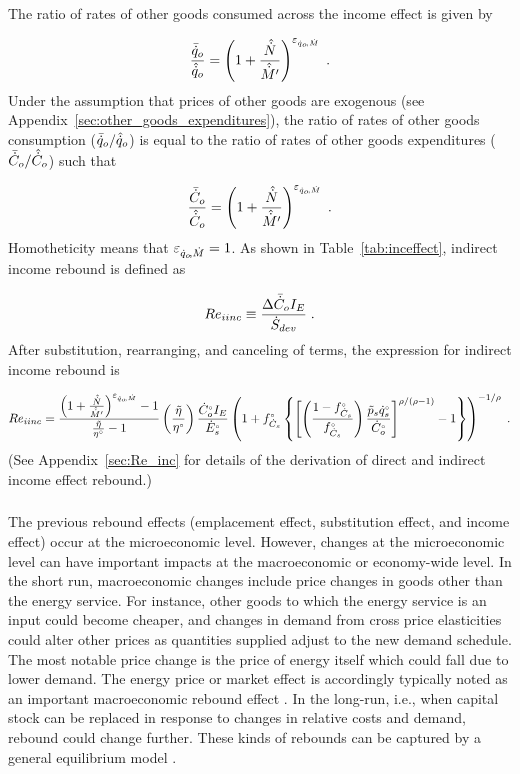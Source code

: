 \documentclass[12pt]{article}\usepackage[]{graphicx}\usepackage[]{xcolor}
\begin{document}
The ratio of rates of other goods consumed across the income effect is given by

\begin{equation} \label{eq:qorat_eqoM}
  \frac{\bar{\dot{q}}_o}{\hat{\dot{q}}_o} = \left( 1 + \frac{\hat{\dot{N}}}{\hat{\dot{M}}^\prime} \right) ^{\varepsilon_{\dot{q}_o\!,\dot{M}}} \; .
\end{equation}
%
Under the assumption that prices of other goods are exogenous
(see Appendix~\ref{sec:other_goods_expenditures}), 
the ratio of rates of other goods consumption ($\bar{\dot{q}}_o/\hat{\dot{q}}_o$)
is equal to the ratio of rates of other goods expenditures ($\bar{\dot{C}}_o/\hat{\dot{C}}_o$)
such that 

\begin{equation} \label{eq:Corat_eqoM}
  \frac{\bar{\dot{C}}_o}{\hat{\dot{C}}_o} = \left( 1 + \frac{\hat{\dot{N}}}{\hat{\dot{M}}^\prime} \right)^{\varepsilon_{\dot{q}_o\!,\dot{M}}} \; .
\end{equation}
%
Homotheticity means that $\varepsilon_{\dot{q}_o\!,\dot{M}} = 1$.
As shown in Table~\ref{tab:inceffect}, indirect income rebound is defined as

\begin{equation} \label{eq:Re_iinc_def}
  Re_{iinc} \equiv \frac{\Delta \bar{\dot{C}}_o I_E}{\dot{S}_{dev}} \; .
\end{equation}
%
After substitution, rearranging, and canceling of terms, 
the expression for indirect income rebound is

\begin{equation} \label{eq:Re_iinc}
  Re_{iinc} = \frac{\left( 1 + \frac{\hat{\dot{N}}}{\hat{\dot{M}}^\prime} \right)^{\varepsilon_{\dot{q}_o\!,\dot{M}}} - 1}{\frac{\tilde{\eta}}{{}{\eta}^{\scriptscriptstyle \circ}} - 1} \left( \frac{\tilde{\eta}}{{}{\eta}^{\scriptscriptstyle \circ}} \right) \frac{{}{\dot{C}}^{\scriptscriptstyle \circ}_o I_E}{{}{\dot{E}}^{\scriptscriptstyle \circ}_s} \left( 1 + {}{f}^{\scriptscriptstyle \circ}_{\dot{C}_s} \left\{ \left[ \left( \frac{1-{}{f}^{\scriptscriptstyle \circ}_{\dot{C}_s}}{{}{f}^{\scriptscriptstyle \circ}_{\dot{C}_s}} \right) \frac{\tilde{p}_s {}{\dot{q}}^{\scriptscriptstyle \circ}_s}{{}{\dot{C}}^{\scriptscriptstyle \circ}_o} \right] ^{\rho/(\rho - 1)} - 1 \right\} \right)^{-1/\rho}{}{} \; .
\end{equation}
%
(See Appendix~\ref{sec:Re_inc} for details of the derivation
of direct and indirect income effect rebound.)


\subsubsection{\Macroeffect}
\label{sec:macro_effect_main_paper}

The previous rebound effects 
(emplacement effect, substitution effect, and income effect)
occur at the microeconomic level. 
However, changes at the microeconomic level can 
have important impacts at the macroeconomic or economy-wide level.
In the short run, macroeconomic changes include price changes in
goods other than the energy service. 
For instance, other goods to
which the energy service is an input could become cheaper, and
changes in demand from cross price elasticities could alter
other prices as quantities supplied adjust to the new demand schedule. 
The most notable price change is the price of
energy itself which could fall due to lower demand.
The energy price or market effect is accordingly typically noted as an
important macroeconomic rebound effect \citep{Gillingham2016}.
In the long-run, i.e., when capital stock can be replaced in response
to changes in relative costs and demand,
rebound could change further. 
These kinds of rebounds can be captured
by a general equilibrium model \citep{Stern2020}.
\end{document}
